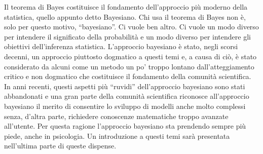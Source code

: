 Il teorema di Bayes costituisce il fondamento dell'approccio più moderno della statistica, quello appunto detto Bayesiano. 
Chi usa il teorema di Bayes non è, solo per questo motivo, \enquote{bayesiano}.
Ci vuole ben altro.
Ci vuole un modo diverso per intendere il significato della probabilità e un modo diverso per intendere gli obiettivi dell'inferenza statistica.
L'approccio bayesiano è stato, negli scorsi decenni, un approccio piuttosto dogmatico a questi temi e, a causa di ciò, è stato considerato da alcuni come un metodo un po' troppo lontano dall'atteggiamento critico e non dogmatico che costituisce il fondamento della comunità scientifica.
In anni recenti, questi aspetti più \enquote{ruvidi} dell'approccio bayesiano sono stati abbandonati e una gran parte della comunità scientifica riconosce all'approccio bayesiano il merito di consentire lo sviluppo di modelli
anche molto complessi senza, d'altra parte, richiedere conoscenze matematiche troppo avanzate all'utente.
Per questa ragione l'approccio bayesiano sta prendendo sempre più piede, anche in psicologia.
Un introduzione a questi temi sarà presentata nell'ultima parte di queste dispense.



